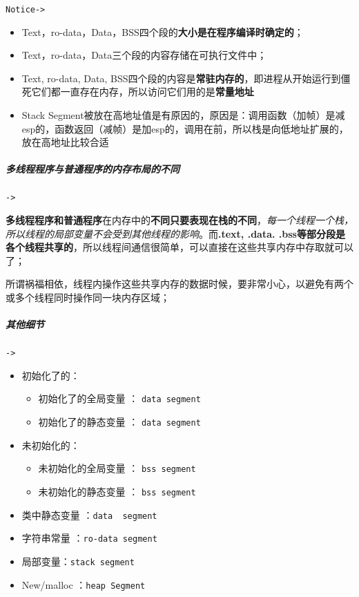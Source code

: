 \documentclass[UTF8,a4paper,8pt]{ctexart}
\begin{document}
			\verb|Notice->|
				\begin{itemize}[itemindent = 2em]
					\item Text，ro-data，Data，BSS四个段的\textbf{大小是在程序编译时确定的}；
					\item Text，ro-data，Data三个段的内容存储在可执行文件中；
					\item Text, ro-data, Data, BSS四个段的内容是\textbf{常驻内存的}，即进程从开始运行到僵死它们都一直存在内存，所以访问它们用的是\textbf{常量地址}
					
					\item Stack Segment被放在高地址值是有原因的，原因是：调用函数（加帧）是减esp的，函数返回（减帧）是加esp的，调用在前，所以栈是向低地址扩展的，放在高地址比较合适
				\end{itemize}

			
			\subparagraph{多线程程序与普通程序的内存布局的不同}\verb|->|
			
				\textbf{多线程程序和普通程序}在内存中的\textbf{不同只要表现在栈的不同}，\textit{每一个线程一个栈，所以线程的局部变量不会受到其他线程的影响}。而\textbf{.text, .data. .bss等部分段是各个线程共享的}，所以线程间通信很简单，可以直接在这些共享内存中存取就可以了；
				
				所谓祸福相依，线程内操作这些共享内存的数据时候，要非常小心，以避免有两个或多个线程同时操作同一块内存区域；
			
			\subparagraph{其他细节}\verb|->|
			
			\begin{itemize}[itemindent = 2em]
				\item 初始化了的：
					\begin{itemize}
						\item 初始化了的全局变量 ： \verb|data segment|
						\item 初始化了的静态变量 ： \verb|data segment|
					\end{itemize}
				\item 未初始化的：
					\begin{itemize}
						\item 未初始化的全局变量 ： \verb|bss segment|
						\item 未初始化的静态变量 ： \verb|bss segment|
					\end{itemize}
				
				\item 类中静态变量 ：\verb|data  segment|
				\item 字符串常量 ：\verb|ro-data segment|
				\item 局部变量：\verb|stack segment|
				\item New/malloc ：\verb|heap Segment|
			\end{itemize}
			
\end{document}
